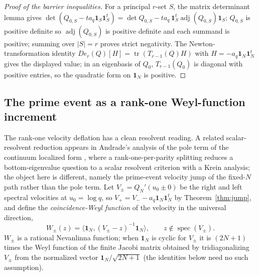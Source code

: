 \documentclass[11pt]{article}
\theoremstyle{plain}
\theoremstyle{definition}
\theoremstyle{remark}
\newcommand{\one}{\mathbf 1}
\newcommand{\adj}{\operatorname{adj}}
\begin{document}
\begin{proof}[Proof of the barrier inequalities]
For a principal $r$-set $S$, the matrix determinant lemma gives
$\det(Q_{0,S}-ta_q\one_S\one_S^t)=\det Q_{0,S}-ta_q\,\one_S^t\adj(Q_{0,S})\one_S$;
$Q_{0,S}$ is positive definite so $\adj(Q_{0,S})$ is positive definite and each
summand is positive; summing over $|S|=r$ proves strict negativity. The
Newton-transformation identity $De_r(Q)[H]=\operatorname{tr}(T_{r-1}(Q)H)$ with
$H=-a_q\one_N\one_N^t$ gives the displayed value; in an eigenbasis of $Q_0$,
$T_{r-1}(Q_0)$ is diagonal with positive entries, so the quadratic form on
$\one_N$ is positive.
\end{proof}

\subsection*{The prime event as a rank-one Weyl-function increment}

The rank-one velocity deflation has a clean resolvent reading. A related
scalar-resolvent reduction appears in Andrade's analysis of the pole term of
the continuum localized form \cite{Silva20682834}, where a
rank-one-per-parity splitting reduces a bottom-eigenvalue question to a scalar
resolvent criterion with a Krein analysis; the object here is different, namely
the prime-event velocity jump of the fixed-$N$ path rather than the pole term.
Let
$V_\pm=Q_N'(u_0\pm0)$ be the
right and left spectral velocities at $u_0=\log q$, so $V_+=V_--a_q\one_N\one_N^t$
by Theorem~\ref{thm:jump}, and define the \emph{coincidence-Weyl function} of the
velocity in the universal direction,
\[
        W_\pm(z)=\bigl\langle\one_N,(V_\pm-z)^{-1}\one_N\bigr\rangle,
        \qquad z\notin\operatorname{spec}(V_\pm).
\]
$W_\pm$ is a rational Nevanlinna function; when $\one_N$ is cyclic for $V_\pm$
it is $(2N+1)$ times the Weyl function of the finite Jacobi matrix obtained by
tridiagonalizing
$V_\pm$ from the normalized vector $\one_N/\sqrt{2N+1}$ (the identities below
need no such assumption).
\end{document}
